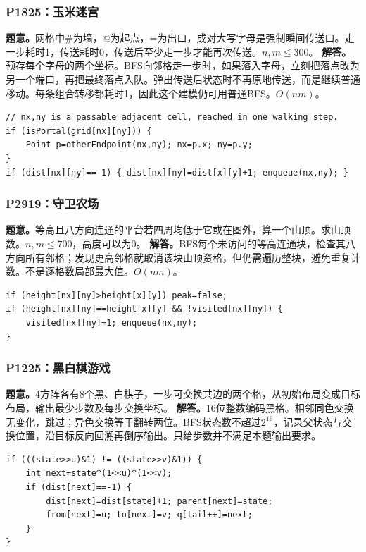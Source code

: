\subsubsection{P1825：玉米迷宫}
\textbf{题意。}网格中\#为墙，@为起点，=为出口，成对大写字母是强制瞬间传送口。走一步耗时1，传送耗时0，传送后至少走一步才能再次传送。$n,m\le300$。
\textbf{解答。}预存每个字母的两个坐标。BFS向邻格走一步时，如果落入字母，立刻把落点改为另一个端口，再把最终落点入队。弹出传送后状态时不再原地传送，而是继续普通移动。每条组合转移都耗时1，因此这个建模仍可用普通BFS。$O(nm)$。
\begin{lstlisting}
// nx,ny is a passable adjacent cell, reached in one walking step.
if (isPortal(grid[nx][ny])) {
    Point p=otherEndpoint(nx,ny); nx=p.x; ny=p.y;
}
if (dist[nx][ny]==-1) { dist[nx][ny]=dist[x][y]+1; enqueue(nx,ny); }
\end{lstlisting}

\subsubsection{P2919：守卫农场}
\textbf{题意。}等高且八方向连通的平台若四周均低于它或在图外，算一个山顶。求山顶数。$n,m\le700$，高度可以为0。
\textbf{解答。}BFS每个未访问的等高连通块，检查其八方向所有邻格；发现更高邻格就取消该块山顶资格，但仍需遍历整块，避免重复计数。不是逐格数局部最大值。$O(nm)$。
\begin{lstlisting}
if (height[nx][ny]>height[x][y]) peak=false;
if (height[nx][ny]==height[x][y] && !visited[nx][ny]) {
    visited[nx][ny]=1; enqueue(nx,ny);
}
\end{lstlisting}

\subsubsection{P1225：黑白棋游戏}
\textbf{题意。}4方阵各有8个黑、白棋子，一步可交换共边的两个格，从初始布局变成目标布局，输出最少步数及每步交换坐标。
\textbf{解答。}16位整数编码黑格。相邻同色交换无变化，跳过；异色交换等于翻转两位。BFS状态数不超过$2^{16}$，记录父状态与交换位置，沿目标反向回溯再倒序输出。只给步数并不满足本题输出要求。
\begin{lstlisting}
if (((state>>u)&1) != ((state>>v)&1)) {
    int next=state^(1<<u)^(1<<v);
    if (dist[next]==-1) {
        dist[next]=dist[state]+1; parent[next]=state;
        from[next]=u; to[next]=v; q[tail++]=next;
    }
}
\end{lstlisting}

